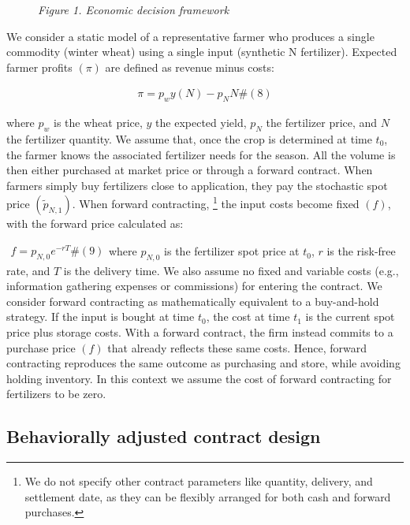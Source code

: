 \documentclass[
]{article}
\begin{document}
\begin{figure}
\centering

\caption{\emph{Figure 1. Economic decision framework}}
\end{figure}

We consider a static model of a representative farmer who produces a
single commodity (winter wheat) using a single input (synthetic N
fertilizer). Expected farmer profits \((\pi)\) are defined as revenue
minus costs:

\[\begin{array}{r}
\pi = p_{w}y(N) - p_{N}N\#(8)
\end{array}\]

where \(p_{w}\) is the wheat price, \(y\) the expected yield, \(p_{N}\)
the fertilizer price, and \(N\) the fertilizer quantity. We assume that,
once the crop is determined at time \(t_{0}\), the farmer knows the
associated fertilizer needs for the season. All the volume is then
either purchased at market price or through a forward contract. When
farmers simply buy fertilizers close to application, they pay the
stochastic spot price \(\left( {\widetilde{p}}_{N,1} \right)\). When
forward contracting, \footnote{We do not specify other contract
  parameters like quantity, delivery, and settlement date, as they can
  be flexibly arranged for both cash and forward purchases.} the input
costs become fixed \((f)\), with the forward price calculated as:

\(\begin{array}{r}
f = p_{N,0}e^{- rT}\#(9)
\end{array}\)where \(p_{N,0}\) is the fertilizer spot price at
\(t_{0}\), \(r\) is the risk-free rate, and \(T\) is the delivery time.
We also assume no fixed and variable costs (e.g., information gathering
expenses or commissions) for entering the contract. We consider forward
contracting as mathematically equivalent to a buy-and-hold strategy. If
the input is bought at time \(t_{0}\), the cost at time \(t_{1}\) is the
current spot price plus storage costs. With a forward contract, the firm
instead commits to a purchase price \((f)\) that already reflects these
same costs. Hence, forward contracting reproduces the same outcome as
purchasing and store, while avoiding holding inventory. In this context
we assume the cost of forward contracting for fertilizers to be zero.

\subsection{Behaviorally adjusted contract
design}\label{behaviorally-adjusted-contract-design}
\end{document}
